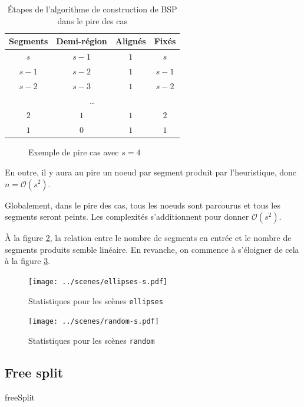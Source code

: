 \documentclass[12pt,twocolumn]{article}
\newcommand{\bigO}{\mathcal{O}}
\newcommand{\es}{\emptyset}
\begin{document}
\begin{table}[h]
\center
\begin{tabular}{c||c|c||c}
	Segments & Demi-région & Alignés & Fixés \\ \hline\hline
	$s$ & $s-1$ & $1$ & $s$ \\ \hline
	$s-1$ & $s-2$ & $1$ & $s-1$ \\ \hline
	$s-2$ & $s-3$ & $1$ & $s-2$ \\ \hline
	\multicolumn{4}{c}{\dots} \\ \hline
	$2$ & $1$ & $1$ & $2$ \\ \hline
	$1$ & $0$ & $1$ & $1$
\end{tabular}
\caption{Étapes de l'algorithme de construction de BSP dans le pire des cas}
\label{tab:worst}
\end{table}

\begin{figure}[h]
\center

\caption{Exemple de pire cas avec $s=4$}\label{fig:worst}
\end{figure}

En outre, il y aura au pire un noeud par segment produit par l'heuristique,
donc $n=\bigO(s^2)$.

Globalement, dans le pire des cas, tous les noeuds sont parcourus et
tous les segments seront peints. Les complexités s'additionnent pour donner
$\bigO(s^2)$.

À la figure \ref{fig:eS}, la relation entre le nombre de segments en entrée et
le nombre de segments produits semble linéaire.
En revanche, on commence à s'éloigner de cela à la figure \ref{fig:rS}.

\begin{figure}[p]
\center
\texttt{[image: ../scenes/ellipses-s.pdf]}
\caption{Statistiques pour les scènes \texttt{ellipses}}\label{fig:eS}
\end{figure}

\begin{figure}[p]
\center
\texttt{[image: ../scenes/random-s.pdf]}
\caption{Statistiques pour les scènes \texttt{random}}\label{fig:rS}
\end{figure}


\subsection{Free split}
\begin{algorithm}
\caption{freeSplit \cite[p.~257]{cg}}
\SetAlgoLined\DontPrintSemicolon
\KwData{$r \neq \es$}
 {
	 {
	}
}
 
~
\end{algorithm}
\end{document}
